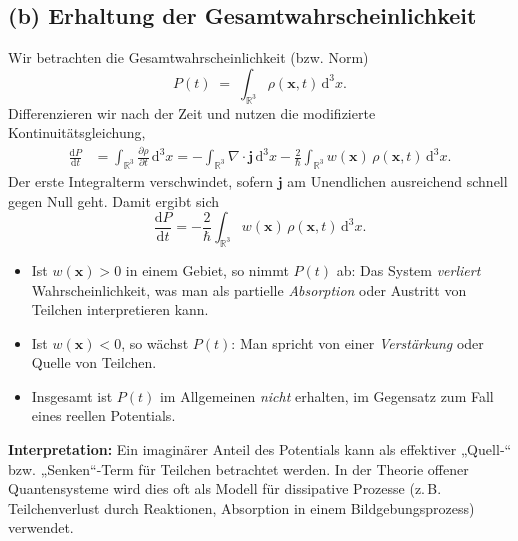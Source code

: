 \documentclass[a4paper,12pt]{article}
\begin{document}
\subsection*{(b) Erhaltung der Gesamtwahrscheinlichkeit}

Wir betrachten die Gesamtwahrscheinlichkeit (bzw. Norm)
\[
P(t) \;=\; \int_{\mathbb{R}^3} \rho(\mathbf{x},t)\,\mathrm{d}^3x.
\]
Differenzieren wir nach der Zeit und nutzen die modifizierte Kontinuitätsgleichung,
\begin{align*}
  \frac{\mathrm{d}P}{\mathrm{d}t}
  &= \int_{\mathbb{R}^3} \frac{\partial \rho}{\partial t}\,\mathrm{d}^3x
   = -\int_{\mathbb{R}^3} \nabla\cdot\mathbf{j}\,\mathrm{d}^3x
     - \frac{2}{\hbar}\int_{\mathbb{R}^3} w(\mathbf{x})\,\rho(\mathbf{x},t)\,\mathrm{d}^3x.
\end{align*}
Der erste Integralterm verschwindet, sofern \(\mathbf{j}\) am Unendlichen ausreichend schnell gegen Null geht. Damit ergibt sich
\[
\boxed{
\frac{\mathrm{d}P}{\mathrm{d}t}
= - \frac{2}{\hbar}\int_{\mathbb{R}^3} w(\mathbf{x})\,\rho(\mathbf{x},t)\,\mathrm{d}^3x.
}
\]
\begin{itemize}
  \item Ist \(w(\mathbf{x}) > 0\) in einem Gebiet, so nimmt \(P(t)\) ab: Das System \emph{verliert} Wahrscheinlichkeit, was man als partielle \emph{Absorption} oder Austritt von Teilchen interpretieren kann.
  \item Ist \(w(\mathbf{x}) < 0\), so wächst \(P(t)\): Man spricht von einer \emph{Verstärkung} oder Quelle von Teilchen.
  \item Insgesamt ist \(P(t)\) im Allgemeinen \emph{nicht} erhalten, im Gegensatz zum Fall eines reellen Potentials.
\end{itemize}

\medskip

\textbf{Interpretation:} Ein imaginärer Anteil des Potentials kann als effektiver „Quell‐“ bzw. „Senken“-Term für Teilchen betrachtet werden. In der Theorie offener Quanten­systeme wird dies oft als Modell für dissipative Prozesse (z.\,B. Teilchenverlust durch Reaktionen, Absorption in einem Bildgebungsprozess) verwendet.
\end{document}
